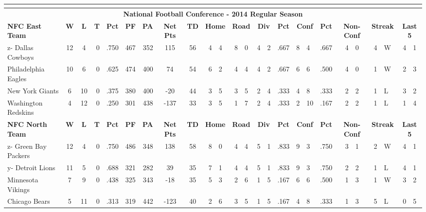 \documentclass{article}
\begin{document}
{\begin{tabular}{|l|c|c|r|c|c|r|c|c|r@{-}l|r@{-}l|r@{-}l|c|r@{-}l|c|r@{-}l|r@{}l|r@{-}l|}
	\hline
	\multicolumn{25}{c}{ } \\
	\hline
	\multicolumn{25}{|c|}{\bfseries National Football Conference - 2014 Regular Season} \\
	\hline
	\hline
	\bfseries NFC East Team & \bfseries W & \bfseries L & \bfseries T & \bfseries Pct & \bfseries PF & \bfseries PA & 
	\bfseries Net Pts & \bfseries TD & \multicolumn{2}{|c|}{\bfseries Home} & \multicolumn{2}{|c|}{\bfseries Road} & 
	\multicolumn{2}{|c|}{\bfseries Div}  & \bfseries Pct & \multicolumn{2}{|c|}{\bfseries Conf} & \bfseries Pct  & 
	\multicolumn{2}{|c|}{\bfseries Non-Conf}
	& \multicolumn{2}{|c|}{\bfseries Streak} &
	\multicolumn{2}{|c|}{\bfseries Last 5} \\
	\hline
	\hline
	z- Dallas Cowboys & 12 & 4 & 0 & .750 & 467 & 352 & 115 & 56 & 4 & 4 & 8 & 0 & 4 & 2 & .667 & 8 & 4 & .667 & 4 & 0 & 4 & W & 4 & 1 \\
	\hline
	Philadelphia Eagles & 10 & 6 & 0 & .625 & 474 & 400 & 74 & 54 & 6 & 2 & 4 & 4 & 4 & 2 & .667 & 6 & 6 & .500 & 4 & 0 & 1 & W & 2 & 3 \\
	\hline
	New York Giants & 6 & 10 & 0 & .375 & 380 & 400 & -20 & 44 & 3 & 5 & 3 & 5 & 2 & 4 & .333 & 4 & 8 & .333  & 2 & 2 & 1 & L & 3 & 2 \\
	\hline
	Washington Redskins & 4 & 12  & 0 & .250 & 301 & 438 & -137 & 33 & 3 & 5 & 1 & 7 & 2 & 4 & .333 & 2 & 10 & .167 & 2 & 2 & 1 & L & 1 & 4 \\
	\hline
	\hline
	\bfseries NFC North Team & \bfseries W & \bfseries L & \bfseries T & \bfseries Pct & \bfseries PF & \bfseries PA & 
	\bfseries Net Pts & \bfseries TD & \multicolumn{2}{|c|}{\bfseries Home} & \multicolumn{2}{|c|}{\bfseries Road} & 
	\multicolumn{2}{|c|}{\bfseries Div}  & \bfseries Pct & \multicolumn{2}{|c|}{\bfseries Conf} & \bfseries Pct  & 
	\multicolumn{2}{|c|}{\bfseries Non-Conf}
	& \multicolumn{2}{|c|}{\bfseries Streak} &
	\multicolumn{2}{|c|}{\bfseries Last 5} \\
	\hline
	\hline
	z- Green Bay Packers & 12 & 4 & 0 & .750 & 486 & 348 & 138 & 58 & 8 & 0 & 4 & 4 & 5 & 1 & .833 & 9 & 3 & .750 & 3  & 1 & 2 & W & 4 & 1 \\
	\hline
	y- Detroit Lions & 11 & 5 & 0 & .688 & 321 & 282 & 39 & 35 & 7 & 1 & 4  & 4 & 5 & 1 & .833 & 9 & 3 & .750 & 2 & 2 & 1 & L & 4 & 1 \\
	\hline
	Minnesota Vikings & 7 & 9 & 0 & .438 & 325 & 343 & -18 & 35 & 5 & 3 & 2 & 6 & 1 & 5 & .167 & 6 & 6 & .500 & 1 & 3 & 1  & W & 3 & 2 \\
	\hline
		Chicago Bears & 5 & 11 & 0 & .313 & 319 & 442 & -123 & 40 & 2 & 6 & 3 & 5 & 1 & 5 & .167 & 4 & 8 & .333 & 1 & 3 & 5 & L & 0 & 5 \\

\end{tabular}}
\end{document}
